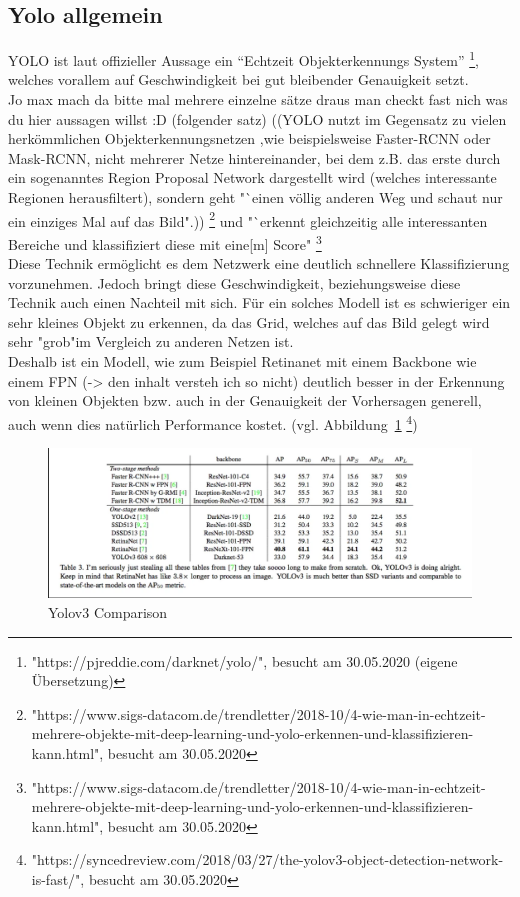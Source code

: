 \documentclass[a4paper,oneside,12pt]{report}
\begin{document}
\begin{onehalfspace}
		\subsection{Yolo allgemein}
		YOLO ist laut offizieller Aussage ein "`Echtzeit Objekterkennungs System"'
		\footnote{"https://pjreddie.com/darknet/yolo/", besucht am 30.05.2020 (eigene Übersetzung)},
		welches vorallem auf Geschwindigkeit bei gut bleibender Genauigkeit setzt.\\
		Jo max mach da bitte mal mehrere einzelne sätze draus man checkt fast nich was du hier aussagen willst :D (folgender satz)
		((YOLO nutzt im Gegensatz zu vielen herkömmlichen Objekterkennungsnetzen ,wie beispielsweise Faster-RCNN oder Mask-RCNN, nicht mehrerer Netze hintereinander, bei dem z.B. das erste durch ein sogenanntes Region Proposal Network dargestellt wird (welches interessante Regionen herausfiltert), sondern geht "`einen völlig anderen Weg und schaut nur ein einziges Mal auf das Bild".))
		\footnote{"https://www.sigs-datacom.de/trendletter/2018-10/4-wie-man-in-echtzeit-mehrere-objekte-mit-deep-learning-und-yolo-erkennen-und-klassifizieren-kann.html", besucht am 30.05.2020}
		und "`erkennt gleichzeitig alle interessanten Bereiche und klassifiziert diese mit eine[m] Score"
		\footnote{"https://www.sigs-datacom.de/trendletter/2018-10/4-wie-man-in-echtzeit-mehrere-objekte-mit-deep-learning-und-yolo-erkennen-und-klassifizieren-kann.html", besucht am 30.05.2020}\\
		Diese Technik ermöglicht es dem Netzwerk eine deutlich schnellere Klassifizierung vorzunehmen. \clearpage
		Jedoch bringt diese Geschwindigkeit, beziehungsweise diese Technik auch einen Nachteil mit sich. Für ein solches Modell ist es schwieriger ein sehr kleines Objekt zu erkennen, da das Grid, welches auf das Bild gelegt wird sehr "grob"\space im Vergleich zu anderen Netzen ist. \\
		Deshalb ist ein Modell, wie zum Beispiel Retinanet mit einem Backbone wie einem FPN (-> den inhalt versteh ich so nicht) deutlich besser in der Erkennung von kleinen Objekten bzw. auch in der Genauigkeit der Vorhersagen generell, auch wenn dies natürlich Performance kostet. (vgl. Abbildung~\ref{fig:comparison}
		\footnote{"https://syncedreview.com/2018/03/27/the-yolov3-object-detection-network-is-fast/", besucht am 30.05.2020})\\
		\begin{figure}[h!]
			\includegraphics[width=\linewidth]{Comparison.png}
			\caption{Yolov3 Comparison}
			\label{fig:comparison}
		\end{figure}

\end{onehalfspace}
\end{document}
